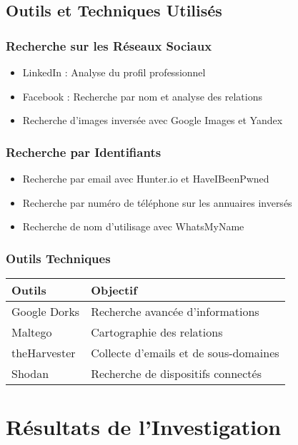 \documentclass[12pt, a4paper]{article}
\begin{document}
\subsection{Outils et Techniques Utilisés}
\subsubsection{Recherche sur les Réseaux Sociaux}
\begin{itemize}
    \item LinkedIn : Analyse du profil professionnel
    \item Facebook : Recherche par nom et analyse des relations
    \item Recherche d'images inversée avec Google Images et Yandex
\end{itemize}

\subsubsection{Recherche par Identifiants}
\begin{itemize}
    \item Recherche par email avec Hunter.io et HaveIBeenPwned
    \item Recherche par numéro de téléphone sur les annuaires inversés
    \item Recherche de nom d'utilisage avec WhatsMyName
\end{itemize}

\subsubsection{Outils Techniques}
\begin{table}[H]
\centering
\begin{tabular}{|p{6cm}|p{6cm}|}
\hline
\textbf{Outils} & \textbf{Objectif} \\
\hline
Google Dorks & Recherche avancée d'informations \\
\hline
Maltego & Cartographie des relations \\
\hline
theHarvester & Collecte d'emails et de sous-domaines \\
\hline
Shodan & Recherche de dispositifs connectés \\
\hline
\end{tabular}
\end{table}

\section{Résultats de l'Investigation}
\end{document}
